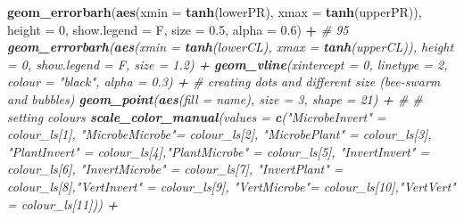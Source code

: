 \documentclass[
]{article}
\newenvironment{Shaded}{\begin{snugshade}}{\end{snugshade}}
\newcommand{\CommentTok}[1]{\textcolor[rgb]{0.56,0.35,0.01}{\textit{#1}}}
\newcommand{\DataTypeTok}[1]{\textcolor[rgb]{0.13,0.29,0.53}{#1}}
\newcommand{\DecValTok}[1]{\textcolor[rgb]{0.00,0.00,0.81}{#1}}
\newcommand{\FloatTok}[1]{\textcolor[rgb]{0.00,0.00,0.81}{#1}}
\newcommand{\KeywordTok}[1]{\textcolor[rgb]{0.13,0.29,0.53}{\textbf{#1}}}
\newcommand{\NormalTok}[1]{#1}
\newcommand{\OperatorTok}[1]{\textcolor[rgb]{0.81,0.36,0.00}{\textbf{#1}}}
\newcommand{\StringTok}[1]{\textcolor[rgb]{0.31,0.60,0.02}{#1}}
\begin{document}
\begin{Shaded}
\begin{Highlighting}[]
{{{{\StringTok{  }\KeywordTok{geom_errorbarh}\NormalTok{(}\KeywordTok{aes}\NormalTok{(}\DataTypeTok{xmin =} \KeywordTok{tanh}\NormalTok{(lowerPR), }\DataTypeTok{xmax =} \KeywordTok{tanh}\NormalTok{(upperPR)),  }\DataTypeTok{height =} \DecValTok{0}\NormalTok{, }\DataTypeTok{show.legend =}\NormalTok{ F, }\DataTypeTok{size =} \FloatTok{0.5}\NormalTok{, }\DataTypeTok{alpha =} \FloatTok{0.6}\NormalTok{) }\OperatorTok{+}
\StringTok{  }\CommentTok{# 95 %
\StringTok{  }\KeywordTok{geom_errorbarh}\NormalTok{(}\KeywordTok{aes}\NormalTok{(}\DataTypeTok{xmin =} \KeywordTok{tanh}\NormalTok{(lowerCL), }\DataTypeTok{xmax =} \KeywordTok{tanh}\NormalTok{(upperCL)),  }\DataTypeTok{height =} \DecValTok{0}\NormalTok{, }\DataTypeTok{show.legend =}\NormalTok{ F, }\DataTypeTok{size =} \FloatTok{1.2}\NormalTok{) }\OperatorTok{+}
\StringTok{  }\KeywordTok{geom_vline}\NormalTok{(}\DataTypeTok{xintercept =} \DecValTok{0}\NormalTok{, }\DataTypeTok{linetype =} \DecValTok{2}\NormalTok{, }\DataTypeTok{colour =} \StringTok{"black"}\NormalTok{, }\DataTypeTok{alpha =} \FloatTok{0.3}\NormalTok{) }\OperatorTok{+}
\StringTok{  }\CommentTok{# creating dots and different size (bee-swarm and bubbles)}
\StringTok{  }\KeywordTok{geom_point}\NormalTok{(}\KeywordTok{aes}\NormalTok{(}\DataTypeTok{fill =}\NormalTok{ name), }\DataTypeTok{size =} \DecValTok{3}\NormalTok{, }\DataTypeTok{shape =} \DecValTok{21}\NormalTok{) }\OperatorTok{+}\StringTok{ }\CommentTok{#}
\StringTok{  }\CommentTok{# setting colours}
\StringTok{  }\KeywordTok{scale_color_manual}\NormalTok{(}\DataTypeTok{values =}  \KeywordTok{c}\NormalTok{(}\StringTok{"MicrobeInvert"}\NormalTok{ =}\StringTok{ }\NormalTok{colour_ls[}\DecValTok{1}\NormalTok{],  }\StringTok{"MicrobeMicrobe"}\NormalTok{=}\StringTok{ }\NormalTok{colour_ls[}\DecValTok{2}\NormalTok{], }\StringTok{"MicrobePlant"}\NormalTok{ =}\StringTok{ }\NormalTok{colour_ls[}\DecValTok{3}\NormalTok{], }\StringTok{"PlantInvert"}\NormalTok{ =}\StringTok{ }\NormalTok{colour_ls[}\DecValTok{4}\NormalTok{],}\StringTok{"PlantMicrobe"}\NormalTok{ =}\StringTok{ }\NormalTok{colour_ls[}\DecValTok{5}\NormalTok{], }\StringTok{"InvertInvert"}\NormalTok{  =}\StringTok{ }\NormalTok{colour_ls[}\DecValTok{6}\NormalTok{],  }\StringTok{"InvertMicrobe"}\NormalTok{ =}\StringTok{ }\NormalTok{colour_ls[}\DecValTok{7}\NormalTok{], }\StringTok{"InvertPlant"}\NormalTok{ =}\StringTok{ }\NormalTok{colour_ls[}\DecValTok{8}\NormalTok{],}\StringTok{"VertInvert"}\NormalTok{  =}\StringTok{ }\NormalTok{colour_ls[}\DecValTok{9}\NormalTok{], }\StringTok{"VertMicrobe"}\NormalTok{=}\StringTok{ }\NormalTok{colour_ls[}\DecValTok{10}\NormalTok{],}\StringTok{"VertVert"}\NormalTok{  =}\StringTok{ }\NormalTok{colour_ls[}\DecValTok{11}\NormalTok{])) }\OperatorTok{+}
}}}}}
\end{Highlighting}
\end{Shaded}
\end{document}
